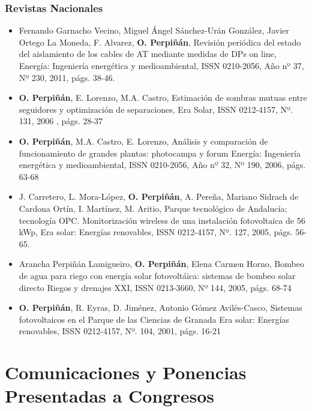 \documentclass[article, a4paper]{memoir}
\begin{document}
\subsubsection{Revistas Nacionales}
\label{sec-5-2-2}

\begin{itemize}
\item Fernando Garnacho Vecino, Miguel Ángel Sánchez-Urán González, Javier
Ortego La Moneda, F. Alvarez, \textbf{O. Perpiñán},
Revisión periódica del estado del aislamiento de los cables de
AT mediante medidas de DPs on line, Energía: Ingeniería
energética y medioambiental, ISSN 0210-2056, Año nº 37, Nº
230, 2011, págs. 38-46.

\item \textbf{O. Perpiñán}, E. Lorenzo, M.A. Castro, Estimación de sombras mutuas
entre seguidores y optimización de separaciones, Era Solar, ISSN
0212-4157, Nº. 131, 2006 , págs. 28-37

\item \textbf{O. Perpiñán}, M.A. Castro, E. Lorenzo, Análisis y
comparación de funcionamiento de grandes plantas: photocampa y forum
Energía: Ingeniería energética y medioambiental, ISSN 0210-2056, Año
nº 32, Nº 190, 2006, págs. 63-68

\item J. Carretero, L. Mora-López, \textbf{O. Perpiñán}, A. Pereña, Mariano Sidrach
de Cardona Ortín, I. Martínez, M. Aritio, Parque tecnológico de
Andalucía: tecnología OPC. Monitorización wireless de una
instalación fotovoltaica de 56 kWp, Era solar: Energías renovables,
ISSN 0212-4157, Nº. 127, 2005, págs. 56-65.

\item Arancha Perpiñán Lamigueiro, \textbf{O. Perpiñán}, Elena Carmen
Horno, Bombeo de agua para riego con energía solar fotovoltáica:
sistemas de bombeo solar directo Riegos y drenajes XXI, ISSN
0213-3660, Nº 144, 2005, págs. 68-74

\item \textbf{O. Perpiñán}, R. Eyras, D. Jiménez, Antonio Gómez
Avilés-Casco, Sistemas fotovoltaicos en el Parque de las
Ciencias de Granada Era solar: Energías renovables, ISSN
0212-4157, Nº. 104, 2001, págs. 16-21
\end{itemize}


\section{Comunicaciones y Ponencias Presentadas a Congresos}
\label{sec-6}
\end{document}
